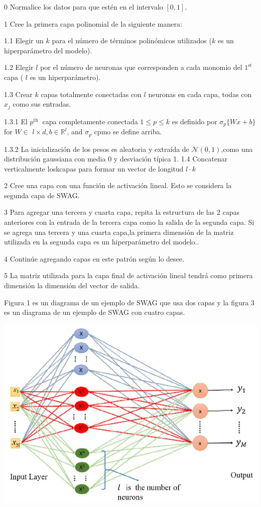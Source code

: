 \documentclass[10pt]{article}
\begin{document}
0 Normalice los datos para que estén en el intervalo $[0,1]$.

1 Cree la primera capa polinomial de la siguiente manera:

1.1 Elegir un $k$ para el número de términos polinómicos utilizados ($k$ es un hiperparámetro del modelo).

$1.2$ Elegir $l$ por el número de neuronas que corresponden a cada monomio del $1^{\text {st }}$ capa ( $l$ es un hiperparámetro).

1.3 Crear $k$ capas totalmente conectadas con $l$ neuronas en cada capa, todas con $x_{j}$ como sus entradas.

1.3.1 El $p^{\text {th }}$ capa completamente conectada $1 \leq p \leq k$ es definido por $\sigma_{p}\{W x+b\}$ for $W \in$ $l \times d, b \in \mathbb{R}^{l}$, and $\sigma_{p}$ cpmo se define arriba.

1.3.2 La inicialización de los pesos es aleatoria y extraída de $\mathcal{N}(0,1)$,como una distribución gaussiana con media 0 y desviación típica 1. 1.4 Concatenar verticalmente loskcapas para formar un vector de longitud $l \cdot k$

2 Cree una capa con una función de activación lineal. Esto se considera la segunda capa de SWAG.

3 Para agregar una tercera y cuarta capa, repita la estructura de las 2 capas anteriores con la entrada de la tercera capa como la salida de la segunda capa. Si se agrega una tercera y una cuarta capa,la primera dimensión de la matriz utilizada en la segunda capa es un hiperparámetro del modelo..

4 Continúe agregando capas en este patrón según lo desee.

5 La matriz utilizada para la capa final de activación lineal tendrá como primera dimensión la dimensión del vector de salida.

Figura 1 es un diagrama de un ejemplo de SWAG que usa dos capas y la figura 3 es un diagrama de un ejemplo de SWAG con cuatro capas.

\includegraphics[max width=\textwidth]{2022_09_28_0067ec14010042dbf918g-04}
\end{document}
